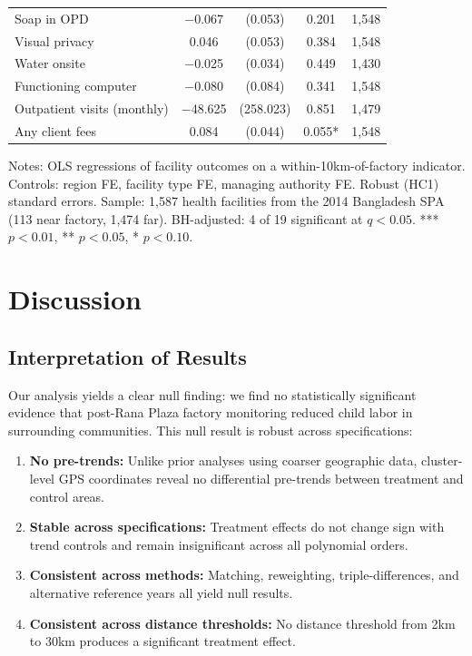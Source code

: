 \documentclass[12pt]{article}
\begin{document}
\begin{table}[H]
\begin{threeparttable}
\begin{tabular}{lcccc}
Soap in OPD & $-$0.067 & (0.053) & 0.201 & 1,548 \\
Visual privacy & 0.046 & (0.053) & 0.384 & 1,548 \\
Water onsite & $-$0.025 & (0.034) & 0.449 & 1,430 \\
Functioning computer & $-$0.080 & (0.084) & 0.341 & 1,548 \\
Outpatient visits (monthly) & $-$48.625 & (258.023) & 0.851 & 1,479 \\
Any client fees & 0.084 & (0.044) & 0.055* & 1,548 \\
\bottomrule
\end{tabular}
\begin{tablenotes}
\footnotesize
\item Notes: OLS regressions of facility outcomes on a within-10km-of-factory indicator. Controls: region FE, facility type FE, managing authority FE. Robust (HC1) standard errors. Sample: 1,587 health facilities from the 2014 Bangladesh SPA (113 near factory, 1,474 far). BH-adjusted: 4 of 19 significant at $q < 0.05$. *** $p<0.01$, ** $p<0.05$, * $p<0.10$.
\end{tablenotes}
\end{threeparttable}
\end{table}


\section{Discussion}

\subsection{Interpretation of Results}

Our analysis yields a clear null finding: we find no statistically significant evidence that post-Rana Plaza factory monitoring reduced child labor in surrounding communities. This null result is robust across specifications:

\begin{enumerate}
\item \textbf{No pre-trends:} Unlike prior analyses using coarser geographic data, cluster-level GPS coordinates reveal no differential pre-trends between treatment and control areas.

\item \textbf{Stable across specifications:} Treatment effects do not change sign with trend controls and remain insignificant across all polynomial orders.

\item \textbf{Consistent across methods:} Matching, reweighting, triple-differences, and alternative reference years all yield null results.

\item \textbf{Consistent across distance thresholds:} No distance threshold from 2km to 30km produces a significant treatment effect.
\end{enumerate}
\end{document}
